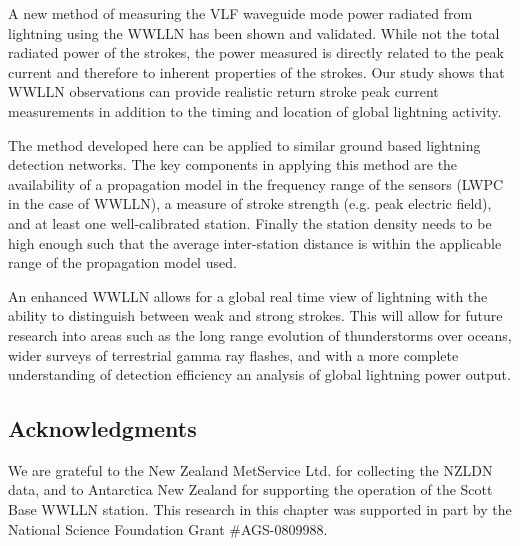 A new method of measuring the VLF waveguide mode power radiated from lightning using the WWLLN has been shown and validated.
While not the total radiated power of the strokes, the power measured is directly related to the peak current and therefore to inherent properties of the strokes.
Our study shows that WWLLN observations can provide realistic return stroke peak current measurements in addition to the timing and location of global lightning activity.

The method developed here can be applied to similar ground based lightning detection networks.
The key components in applying this method are the availability of a propagation model in the frequency range of the sensors (LWPC in the case of WWLLN), a measure of stroke strength (e.g. peak electric field), and at least one well-calibrated station.
Finally the station density needs to be high enough such that the average inter-station distance is within the applicable range of the propagation model used.

An enhanced WWLLN allows for a global real time view of lightning with the ability to distinguish between weak and strong strokes.
This will allow for future research into areas such as the long range evolution of thunderstorms over oceans, wider surveys of terrestrial gamma ray flashes, and with a more complete understanding of detection efficiency an analysis of global lightning power output.

\subsection*{Acknowledgments} 
We are grateful to the New Zealand MetService Ltd. for collecting the NZLDN data, and to Antarctica New Zealand for supporting the operation of the Scott Base WWLLN station.
This research in this chapter was supported in part by the National Science Foundation Grant \#AGS-0809988.
